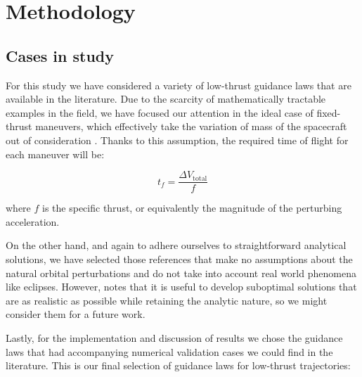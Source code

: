 \chapter{Methodology} \label{methodology}

\section{Cases in study} \label{cases}

For this study we have considered a variety of low-thrust guidance laws that are available in the literature. Due to the scarcity of mathematically tractable examples in the field, we have focused our attention in the ideal case of fixed-thrust maneuvers, which effectively take the variation of mass of the spacecraft out of consideration \cite{battin1999introduction}. Thanks to this assumption, the required time of flight for each maneuver will be:

\[
t_f = \frac{\Delta V_{\text{total}}}{f}
\]

where $f$ is the specific thrust, or equivalently the magnitude of the perturbing acceleration.

On the other hand, and again to adhere ourselves to straightforward analytical solutions, we have selected those references that make no assumptions about the natural orbital perturbations and do not take into account real world phenomena like eclipses. However, \cite{kechichian1997reformulation} notes that it is useful to develop suboptimal solutions that are as realistic as possible while retaining the analytic nature, so we might consider them for a future work.

Lastly, for the implementation and discussion of results we chose the guidance laws that had accompanying numerical validation cases we could find in the literature. This is our final selection of guidance laws for low-thrust trajectories:

